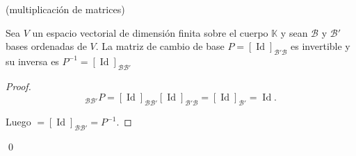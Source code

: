 \documentclass[handout]{beamer} %
\newcommand{\Id}{\operatorname{Id}}
\newcommand{\K}{\mathbb K}
\begin{document}
\begin{frame}

(multiplicación de matrices)
\end{frame}


\begin{frame}
    \begin{corolario}\label{cor-inversa-matriz-cambio-de-base} Sea $V$ un espacio vectorial de dimensión finita sobre el cuerpo $\K$ y sean $\mathcal B$ y $\mathcal B'$ bases ordenadas de $V$. La matriz de cambio de base  $P =[\Id]_{\mathcal B' \mathcal B}$ es invertible y su  inversa es $P^{-1} =[\Id]_{\mathcal B \mathcal B'}$
    \end{corolario}\pause
    \begin{proof}\pause
        \begin{equation*}
            [\Id]_{\mathcal B \mathcal B'} P =[\Id]_{\mathcal B \mathcal B'}[\Id]_{\mathcal B' \mathcal B} = [\Id]_{\mathcal B'} = \Id.
        \end{equation*}

        Luego $=[\Id]_{\mathcal B \mathcal B'} = P^{-1}$.
    \end{proof}\qed

\end{frame}
\end{document}
